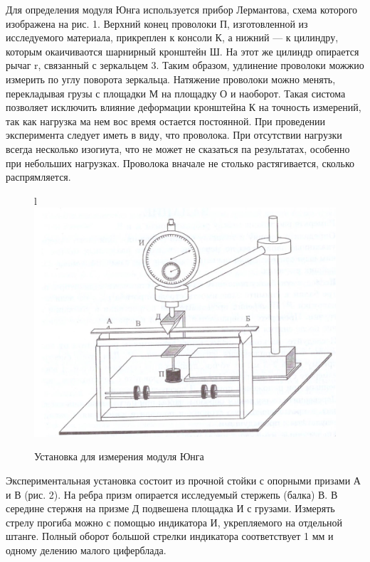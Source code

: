 \documentclass[a4paper, 12pt]{article}
\begin{document}
Для определения модуля Юнга используется прибор Лермантова, схема которого изображена на рис. 1. Верхний конец проволоки П, изготовленной из исследуемого материала, прикреплен к консоли К, а нижний — к цилиндру, которым окаичиваотся шарнирный кронштейн Ш. На этот же цилиндр опирается рычаг r, связанный с зеркальцем 3. Таким образом, удлинение проволоки можжио измерить по углу поворота зеркальца.
Натяжение проволоки можно менять, перекладывая грузы с площадки М на площадку О и наоборот. Такая систома позволяет исключить влияние деформации кронштейна К на точность измерений, так как нагрузка ма нем вос время остается постоянной.
При проведении эксперимента следует иметь в виду, что проволока. При отсутствии нагрузки всегда несколько изогиута, что не может не сказаться па результатах, особенно при небольших нагрузках. Проволока вначале не столько растягивается, сколько распрямляется. \clearpage

\begin{figure}{l}
    \centering
    \includegraphics[width=\linewidth]{setup2.png}
	\caption{Установка для измерения модуля Юнга}
    \label{pic:setup2}
\end{figure}

Экспериментальная установка состоит из прочной стойки с опорными призами А и В (рис. 2). На ребра призм опирается исследуемый стержепь (балка) В. В середине стержня на призме Д подвешена площадка И с грузами. Измерять стрелу прогиба можно с помощью индикатора И, укрепляемого на отдельной штанге. Полный оборот большой стрелки индикатора соответствует 1 мм и одному делению малого циферблада.
\end{document}
